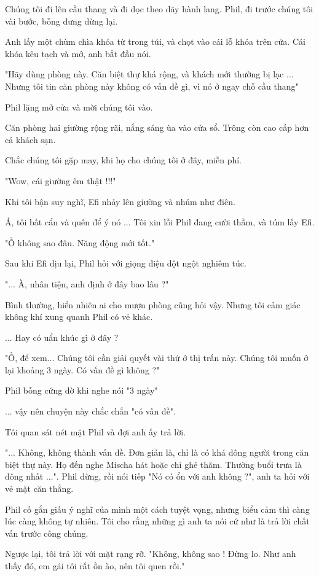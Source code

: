 Chúng tôi đi lên cầu thang và đi dọc theo dãy hành lang. Phil, đi trước chúng tôi vài bước, bỗng dưng dừng lại.

Anh lấy một chùm chìa khóa từ trong túi, và chọt vào cái lỗ khóa trên cửa. Cái khóa kêu tạch và mở, anh bắt đầu nói. 

"Hãy dùng phòng này. Căn biệt thự khá rộng, và khách mới thường bị lạc ... Nhưng tôi tin căn phòng này không có vấn đề gì, vì nó ở ngay chỗ cầu thang"

Phil lặng mở cửa và mời chúng tôi vào.

Căn phòng hai giường rộng rãi, nắng sáng ùa vào cửa sổ. Trông còn cao cấp hơn cả khách sạn.

Chắc chúng tôi gặp may, khi họ cho chúng tôi ở đây, miễn phí.

"Wow, cái giường êm thật !!!"

Khi tôi bận suy nghĩ, Efi nhảy lên giường và nhúm như điên.

Á, tôi bất cẩn và quên để ý nó ... Tôi xin lỗi Phil đang cười thầm, và túm lấy Efi.

"Ồ không sao đâu. Năng động mới tốt."

Sau khi Efi dịu lại, Phil hỏi với giọng điệu đột ngột nghiêm túc. 

"... À, nhân tiện, anh định ở đây bao lâu ?"

 Bình thường, hiển nhiên ai cho mượn phòng cũng hỏi vậy. Nhưng tôi cảm giác không khí xung quanh Phil có vẻ khác.
 
 ... Hay có uẩn khúc gì ở đây ?
 
 "Ồ, để xem... Chúng tôi cần giải quyết vài thứ ở thị trấn này. Chúng tôi muốn ở lại khoảng 3 ngày. Có vấn đề gì không ?"
 
 Phil bỗng cứng đờ khi nghe nói "3 ngày"
 
 ... vậy nên chuyện này chắc chắn "có vấn đề".
 
 Tôi quan sát nét mặt Phil và đợi anh ấy trả lời.
 
 "... Không, không thành vấn đề. Đơn giản là, chỉ là có khá đông người trong căn biệt thự này. Họ đến nghe Mischa hát hoặc chỉ ghé thăm. Thường buổi trưa là đông nhất ...". Phil dừng, rồi nói tiếp "Nó có ổn với anh không ?", anh ta hỏi với vẻ mặt căn thẳng.
 
 Phil cố gắn giấu ý nghĩ của mình một cách tuyệt vọng, nhưng biểu cảm thì càng lúc càng không tự nhiên. Tôi cho rằng những gì anh ta nói cứ như là trả lời chất vấn trước công chúng.
 
 Ngược lại, tôi trả lời với mặt rạng rỡ. "Không, không sao ! Đừng lo. Như anh thấy đó, em gái tôi rất ồn ào, nên tôi quen rồi."
 
